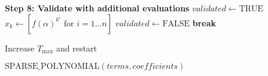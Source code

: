 \begin{algorithm}
\begin{algorithmic}[1]
    \State \textbf{Step 8: Validate with additional evaluations}
    \State $validated \gets \text{TRUE}$
        \State $x_k \gets [f(\alpha)^{k^i} \text{ for } i = 1 \dots n]$
            \State $validated \gets \text{FALSE}$
            \State \textbf{break}
        \EndIf
    \EndFor
    
        \State Increase $T_{\max}$ and restart
    \EndIf
    
    \State \Return $\text{SPARSE\_POLYNOMIAL}(terms, coefficients)$
    \end{algorithmic}
    \end{algorithm}
    
    
